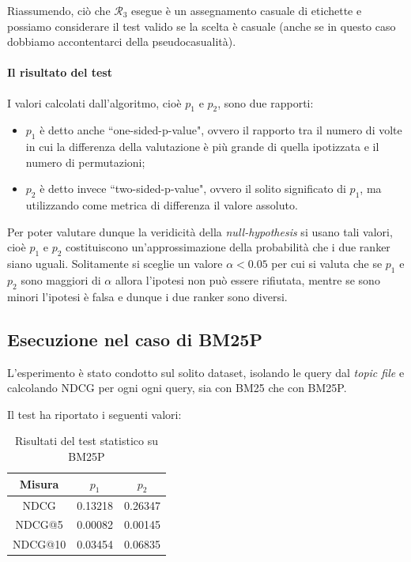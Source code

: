 Riassumendo, ciò che $\mathcal{R}_3$ esegue è un assegnamento casuale di etichette e
possiamo considerare il test valido se la scelta è casuale (anche se in questo caso
dobbiamo accontentarci della pseudocasualità).

\paragraph{Il risultato del test}
I valori calcolati dall'algoritmo, cioè $p_1$ e $p_2$, sono due rapporti:

\begin{itemize}
	\item $p_1$ è detto anche ``one-sided-p-value", ovvero il rapporto tra il numero di volte in cui la differenza
	della valutazione è più grande di quella ipotizzata e il numero di permutazioni;
	\item $p_2$ è detto invece ``two-sided-p-value", ovvero il solito significato di $p_1$, ma utilizzando
	come metrica di differenza il valore assoluto.
\end{itemize}


Per poter valutare dunque la veridicità della \textit{null-hypothesis} si usano tali valori,
cioè $p_1$ e $p_2$ costituiscono un'approssimazione della probabilità che i due ranker
siano uguali. Solitamente si sceglie un valore $\alpha < 0.05$ per cui si valuta che
se $p_1$ e $p_2$ sono maggiori di $\alpha$ allora l'ipotesi non può essere rifiutata,
mentre se sono minori l'ipotesi è falsa e dunque i due ranker sono diversi.

\pagebreak

\subsection{Esecuzione nel caso di BM25P}
L'esperimento è stato condotto sul solito dataset, isolando le query dal\textit{ topic file} e calcolando NDCG
per ogni ogni query, sia con BM25 che con BM25P.

Il test ha riportato i seguenti valori:

\begin{table}[h!]
	\centering
	\begin{tabular}{|c|c|c|}
		\hline
		\textbf{Misura} & $p_1$ & $p_2$ \\
		\hline
		NDCG  & 0.13218 & 0.26347 \\
		\hline
		NDCG@5 & 0.00082 & 0.00145 \\
		\hline
		NDCG@10 & 0.03454 & 0.06835 \\
		\hline
	\end{tabular}
	\caption{Risultati del test statistico su BM25P}
\end{table}

